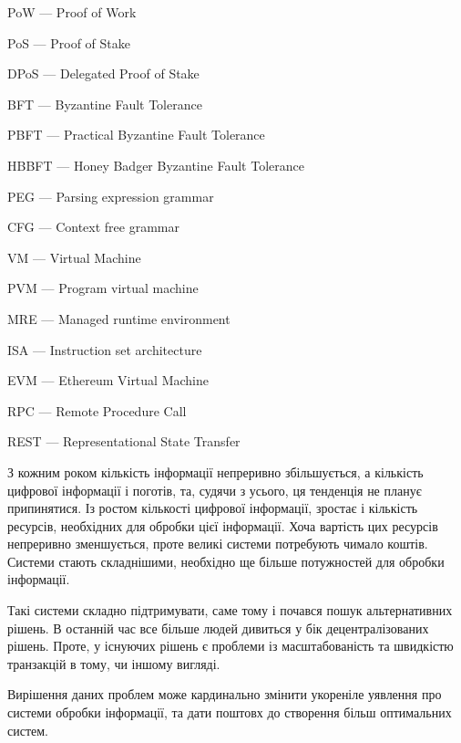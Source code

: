 \documentclass{lib/styles/default-style}
\begin{document}
\pagestyle{default-numbered}

\tableofcontents

\newpage


    PoW --- Proof of Work

    PoS --- Proof of Stake

    DPoS --- Delegated Proof of Stake

    BFT --- Byzantine Fault Tolerance
    
    PBFT --- Practical Byzantine Fault Tolerance
    
    HBBFT --- Honey Badger Byzantine Fault Tolerance
    
    PEG --- Parsing expression grammar
    
    CFG --- Context free grammar
    
    VM --- Virtual Machine
    
    PVM --- Program virtual machine
    
    MRE --- Managed runtime environment
    
    ISA --- Instruction set architecture

    EVM --- Ethereum Virtual Machine

    RPC --- Remote Procedure Call

    REST --- Representational State Transfer

\newpage


    З кожним роком кількість інформації непреривно збільшується, а кількість цифрової інформації і поготів,
    та, судячи з усього, ця тенденція не планує припинятися. Із ростом кількості цифрової інформації, зростає і
    кількість ресурсів, необхідних для обробки цієї інформації. Хоча вартість цих ресурсів непреривно зменшується,
    проте великі системи потребують чимало коштів. Системи стають складнішими, необхідно ще більше потужностей для обробки інформації.

    Такі системи складно підтримувати, саме тому і почався пошук альтернативних рішень. В останній час все більше людей дивиться у бік
    децентралізованих рішень. Проте, у існуючих рішень є проблеми із масштабованість та швидкістю транзакцій в тому, чи іншому вигляді.

    Вирішення даних проблем може кардинально змінити укореніле уявлення про системи обробки інформації, та дати поштовх до створення
    більш оптимальних систем.
\end{document}
